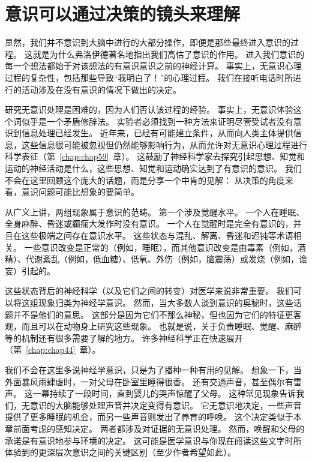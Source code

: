\section{意识可以通过决策的镜头来理解}

显然，我们并不意识到大脑中进行的大部分操作，即便是那些最终进入意识的过程。
这就是为什么弗洛伊德著名地指出我们高估了意识的作用。
进入我们意识的每一个想法都始于对该想法的有意识意识之前的神经计算。
事实上，无意识心理过程的复杂性，包括那些导致“我明白了！”的心理过程。
我们在接听电话时所进行的活动涉及在没有意识的情况下做出的决定。


研究无意识处理是困难的，因为人们否认该过程的经验。
事实上，无意识体验这个词似乎是一个矛盾修辞法。
实验者必须找到一种方法来证明尽管受试者没有意识到信息处理已经发生。
近年来，已经有可能建立条件，从而向人类主体提供信息，这些信息很可能被忽视但仍然能够影响行为，从而允许对无意识心理过程进行科学表征（第~\ref{chap:chap59}~章）。
这鼓励了神经科学家去探究引起思想、知觉和运动的神经活动是什么，这些思想、知觉和运动确实达到了有意识的意识。
我们不会在这里回顾这个庞大的话题，而是分享一个中肯的见解：
从决策的角度来看，意识问题可能比想象的要简单。


从广义上讲，两组现象属于意识的范畴。
第一个涉及觉醒水平。
一个人在睡眠、全身麻醉、昏迷或癫痫大发作时没有意识。
一个人在觉醒时是完全有意识的，并且在这些极端之间存在意识水平。
这些状态与混乱、解离、昏迷和迟钝等术语相关。
一些意识改变是正常的（例如，睡眠），而其他意识改变是由毒素（例如，酒精）、代谢紊乱（例如，低血糖）、低氧、外伤（例如，脑震荡）或发烧（例如，谵妄）引起的。


这些状态背后的神经科学（以及它们之间的转变）对医学来说非常重要。
我们可以将这组现象归类为神经学意识。
然而，当大多数人谈到意识的奥秘时，这些话题并不是他们的意思。
这部分是因为它们不那么神秘，但也因为它们的特征更客观，而且可以在动物身上研究这些现象。
也就是说，关于负责睡眠、觉醒、麻醉等的机制还有很多需要了解的地方。
许多神经科学正在快速展开（第~\ref{chap:chap44}~章）。


我们不会在这里多说神经学意识，只是为了播种一种有用的见解。
想象一下，当外面暴风雨肆虐时，一对父母在卧室里睡得很香。
还有交通声音，甚至偶尔有雷声。
这一幕持续了一段时间，直到婴儿的哭声惊醒了父母。
这种常见现象告诉我们，无意识的大脑能够处理声音并决定变得有意识。
它无意识地决定，一些声音提供了更多睡眠的机会，而另一些声音则发出了养育的呼唤。
这个决定类似于本章前面考虑的感知决定。 两者都涉及对证据的无意识处理。
然而，唤醒和父母的承诺是有意识地参与环境的决定。
这可能是医学意识与你现在阅读这些文字时所体验到的更深层次意识之间的关键区别（至少作者希望如此）。


